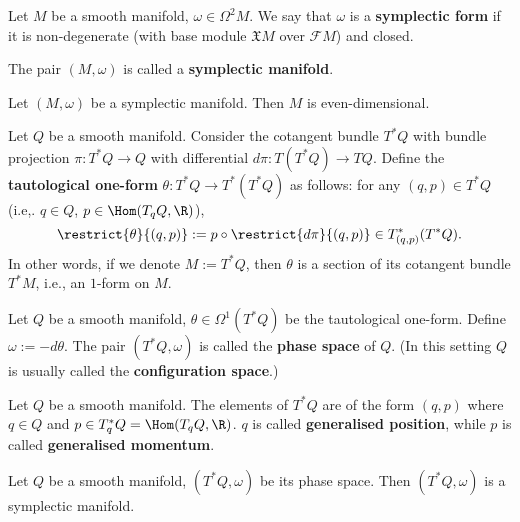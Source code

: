\begin{definition}
  Let $M$ be a smooth manifold, $\omega \in \Omega^2 M$.
  We say that $\omega$ is a \textbf{symplectic form}
  if it is non-degenerate
  (with base module $\mathfrak{X} M$ over $\mathcal{F} M$) and closed.

  The pair $(M, \omega)$ is called a \textbf{symplectic manifold}.
\end{definition}
\begin{proposition}
  Let $(M, \omega)$ be a symplectic manifold.
  Then $M$ is even-dimensional.
\end{proposition}
\begin{definition}
  Let $Q$ be a smooth manifold.
  Consider the cotangent bundle $T^* Q$ with bundle projection
  $\pi \colon T^* Q \to Q$
  with differential $d \pi \colon T(T^* Q) \to T Q$.
  Define the \textbf{tautological one-form}
  $\theta \colon T^* Q \to T^* (T^* Q)$ as follows:
  for any $(q, p) \in T^*Q$ (i.e,. $q \in Q$, $p \in \Hom(T_q Q, \R)$),
  \begin{equation}
    \restrict{\theta}{(q, p)}
    := p \circ \restrict{d \pi}{(q, p)} \in T^*_{(q, p)}(T^* Q).
  \end{equation}
  In other words, if we denote $M := T^* Q$, then $\theta$ is a section of its
  cotangent bundle $T^* M$, i.e., an $1$-form on $M$. 
\end{definition}
\begin{definition}
  Let
    $Q$ be a smooth manifold,
    $\theta \in \Omega^1(T^* Q)$ be the tautological one-form.
  Define $\omega := - d \theta$.
  The pair $(T^* Q, \omega)$ is called the \textbf{phase space} of $Q$.
  (In this setting $Q$ is usually called the \textbf{configuration space}.)
\end{definition}
\begin{remark}
  Let $Q$ be a smooth manifold.
  The elements of $T^* Q$ are of the form $(q, p)$ where $q \in Q$ and
  $p \in T^*_q Q = \Hom(T_q Q, \R)$.
  $q$ is called \textbf{generalised position}, while $p$ is called
  \textbf{generalised momentum}.
\end{remark}
\begin{proposition}
  Let
    $Q$ be a smooth manifold,
    $(T^* Q, \omega)$ be its phase space.
  Then $(T^* Q, \omega)$ is a symplectic manifold.
\end{proposition}
